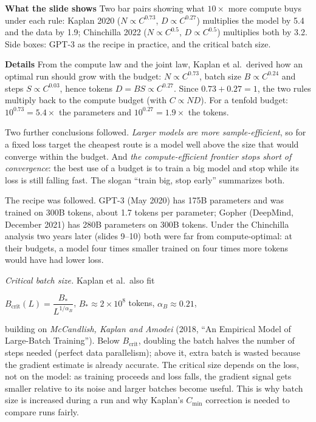\documentclass[11pt,letterpaper]{article}
\newcommand{\para}[1]{\medskip\noindent\textbf{#1}\quad}
\newenvironment{formulas}{\begin{tcolorbox}[formulabox]}{\end{tcolorbox}}
\begin{document}
\para{What the slide shows} Two bar pairs showing what $10\times$ more compute buys under each rule: Kaplan 2020 ($N\propto C^{0.73}$, $D\propto C^{0.27}$) multiplies the model by 5.4 and the data by 1.9; Chinchilla 2022 ($N\propto C^{0.5}$, $D\propto C^{0.5}$) multiplies both by 3.2. Side boxes: GPT-3 as the recipe in practice, and the critical batch size.

\para{Details} From the compute law and the joint law, Kaplan et al.\ derived how an optimal run should grow with the budget: $N\propto C^{0.73}$, batch size $B\propto C^{0.24}$ and steps $S\propto C^{0.03}$, hence tokens $D=BS\propto C^{0.27}$. Since $0.73+0.27=1$, the two rules multiply back to the compute budget (with $C\propto ND$). For a tenfold budget: $10^{0.73}=5.4\times$ the parameters and $10^{0.27}=1.9\times$ the tokens.

Two further conclusions followed. \emph{Larger models are more sample-efficient}, so for a fixed loss target the cheapest route is a model well above the size that would converge within the budget. And \emph{the compute-efficient frontier stops short of convergence}: the best use of a budget is to train a big model and stop while its loss is still falling fast. The slogan ``train big, stop early'' summarizes both.

The recipe was followed. GPT-3 (May 2020) has 175B parameters and was trained on 300B tokens, about 1.7 tokens per parameter; Gopher (DeepMind, December 2021) has 280B parameters on 300B tokens. Under the Chinchilla analysis two years later (slides 9--10) both were far from compute-optimal: at their budgets, a model four times smaller trained on four times more tokens would have had lower loss.

\emph{Critical batch size.} Kaplan et al.\ also fit
\begin{formulas}
$B_{\text{crit}}(L)=\dfrac{B_*}{L^{1/\alpha_B}}$, \qquad $B_*\approx2\times10^8$ tokens, \quad $\alpha_B\approx0.21$,
\end{formulas}
building on \emph{McCandlish, Kaplan and Amodei} (2018, ``An Empirical Model of Large-Batch Training''). Below $B_{\text{crit}}$, doubling the batch halves the number of steps needed (perfect data parallelism); above it, extra batch is wasted because the gradient estimate is already accurate. The critical size depends on the loss, not on the model: as training proceeds and loss falls, the gradient signal gets smaller relative to its noise and larger batches become useful. This is why batch size is increased during a run and why Kaplan's $C_{\min}$ correction is needed to compare runs fairly.
\end{document}
